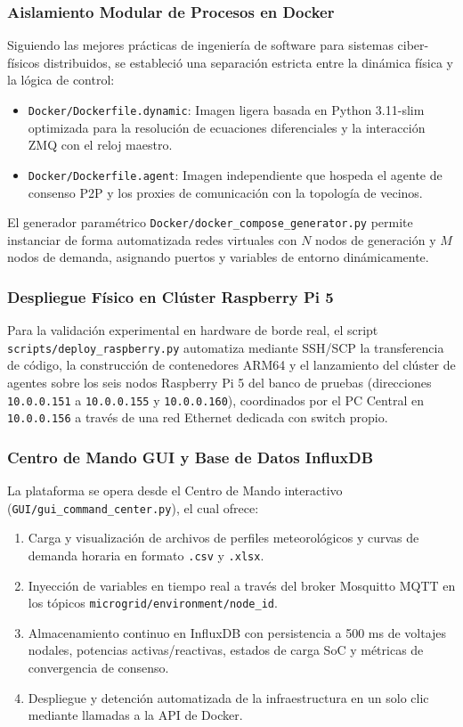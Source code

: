 \subsubsection{Aislamiento Modular de Procesos en Docker}
Siguiendo las mejores prácticas de ingeniería de software para sistemas ciber-físicos distribuidos, se estableció una separación estricta entre la dinámica física y la lógica de control:
\begin{itemize}
    \item \texttt{Docker/Dockerfile.dynamic}: Imagen ligera basada en Python 3.11-slim optimizada para la resolución de ecuaciones diferenciales y la interacción ZMQ con el reloj maestro.
    \item \texttt{Docker/Dockerfile.agent}: Imagen independiente que hospeda el agente de consenso P2P y los proxies de comunicación con la topología de vecinos.
\end{itemize}
El generador paramétrico \texttt{Docker/docker\_compose\_generator.py} permite instanciar de forma automatizada redes virtuales con $N$ nodos de generación y $M$ nodos de demanda, asignando puertos y variables de entorno dinámicamente.

\subsubsection{Despliegue Físico en Clúster Raspberry Pi 5}
Para la validación experimental en hardware de borde real, el script \texttt{scripts/deploy\_raspberry.py} automatiza mediante SSH/SCP la transferencia de código, la construcción de contenedores ARM64 y el lanzamiento del clúster de agentes sobre los seis nodos Raspberry Pi 5 del banco de pruebas (direcciones \texttt{10.0.0.151} a \texttt{10.0.0.155} y \texttt{10.0.0.160}), coordinados por el PC Central en \texttt{10.0.0.156} a través de una red Ethernet dedicada con switch propio.

\subsubsection{Centro de Mando GUI y Base de Datos InfluxDB}
La plataforma se opera desde el Centro de Mando interactivo (\texttt{GUI/gui\_command\_center.py}), el cual ofrece:
\begin{enumerate}[1.]
    \item Carga y visualización de archivos de perfiles meteorológicos y curvas de demanda horaria en formato \texttt{.csv} y \texttt{.xlsx}.
    \item Inyección de variables en tiempo real a través del broker Mosquitto MQTT en los tópicos \texttt{microgrid/environment/node\_id}.
    \item Almacenamiento continuo en InfluxDB con persistencia a 500 ms de voltajes nodales, potencias activas/reactivas, estados de carga SoC y métricas de convergencia de consenso.
    \item Despliegue y detención automatizada de la infraestructura en un solo clic mediante llamadas a la API de Docker.
\end{enumerate}
